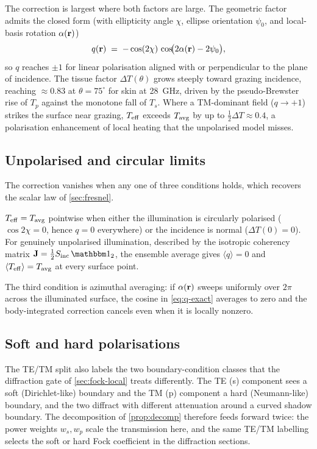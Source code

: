 The correction is largest where both factors are large. The geometric factor
admits the closed form (with ellipticity angle $\chi$, ellipse orientation
$\psi_0$, and local-basis rotation $\alpha(\mathbf{r})$)
\begin{equation}\label{eq:q-exact}
  q(\mathbf{r}) \;=\; -\cos(2\chi)\,\cos\!\bigl(2\alpha(\mathbf{r})-2\psi_0\bigr),
\end{equation}
so $q$ reaches $\pm1$ for linear polarisation aligned with or perpendicular to
the plane of incidence. The tissue factor $\Delta T(\theta)$ grows steeply
toward grazing incidence, reaching $\approx0.83$ at $\theta=75^\circ$ for skin
at \SI{28}{\giga\hertz}, driven by the pseudo-Brewster rise of $T_p$ against the
monotone fall of $T_s$. Where a TM-dominant field ($q\to+1$) strikes the surface
near grazing, $T_{\mathrm{eff}}$ exceeds $T_{\mathrm{avg}}$ by up to $\tfrac{1}{2}\Delta T\approx0.4$,
a polarisation enhancement of local heating that the unpolarised model misses.

\subsection{Unpolarised and circular limits}\label{sec:pol-limits}

The correction vanishes when any one of three conditions holds, which recovers
the scalar law of \cref{sec:fresnel}.

\begin{corollary}\label{cor:collapse}
$T_{\mathrm{eff}}=T_{\mathrm{avg}}$ pointwise when either the illumination is circularly polarised
($\cos2\chi=0$, hence $q=0$ everywhere) or the incidence is normal
($\Delta T(0)=0$). For genuinely unpolarised illumination, described by the
isotropic coherency matrix $\mathbf{J}=\half\Sinc\,\ident_2$, the ensemble
average gives $\langle q\rangle=0$ and $\langle T_{\mathrm{eff}}\rangle=T_{\mathrm{avg}}$ at every
surface point.
\end{corollary}

The third condition is azimuthal averaging: if $\alpha(\mathbf{r})$ sweeps uniformly
over $2\pi$ across the illuminated surface, the cosine in \cref{eq:q-exact}
averages to zero and the body-integrated correction cancels even when it is
locally nonzero.

\subsection{Soft and hard polarisations}\label{sec:soft-hard}

The TE/TM split also labels the two boundary-condition classes that the
diffraction gate of \cref{sec:fock-local} treats differently. The TE (s)
component sees a soft (Dirichlet-like) boundary and the TM (p) component a hard
(Neumann-like) boundary, and the two diffract with different attenuation around
a curved shadow boundary. The decomposition of \cref{prop:decomp} therefore
feeds forward twice: the power weights $w_s,w_p$ scale the transmission here, and
the same TE/TM labelling selects the soft or hard Fock coefficient in the
diffraction sections.
